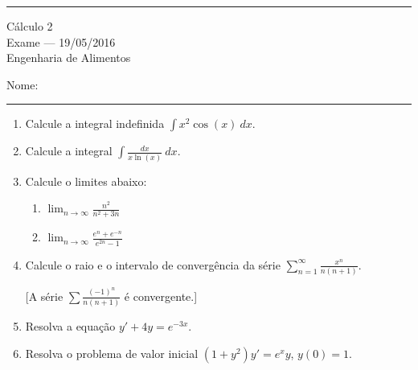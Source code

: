 \documentclass{article}
\newcommand{\ds}{\displaystyle}
\begin{document}
\noindent{}\rule{\textwidth}{0.4pt}
\begin{center}
	C\'alculo 2\\
	Exame --- 19/05/2016 \\
	Engenharia de Alimentos \\
	\vspace{0.2cm}
\end{center}
Nome: \\
\noindent{}\rule{\textwidth}{0.4pt}

\begin{enumerate}
\item Calcule a integral indefinida $\ds\int x^2\cos(x)\ dx$.

\item Calcule a integral $\ds\int \frac{dx}{x\ln(x)}\ dx$.

\item Calcule o limites abaixo:
	\begin{enumerate}
		\item $\ds\lim_{n\rightarrow\infty}\frac{n^2}{n^2+3n}$
		\item $\ds\lim_{n\rightarrow\infty}\frac{e^n+e^{-n}}{e^{2n}-1}$
	\end{enumerate}

\item Calcule o raio e o intervalo de converg\^encia da s\'erie $\ds\sum_{n=1}^\infty \frac{x^n}{n(n+1)}$.

[A s\'erie $\sum\frac{(-1)^n}{n(n+1)}$ \'e convergente.]

\item Resolva a equa\c{c}\~ao $\ds y'+4y=e^{-3x}$.

\item Resolva o problema de valor inicial $\ds(1+y^2)y'=e^{x}y$, $y(0)=1$.

\end{enumerate}
\end{document}
